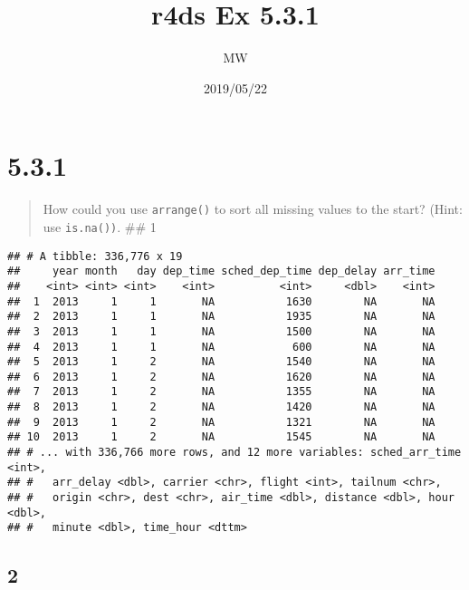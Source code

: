 \documentclass[]{article}
\title{r4ds Ex 5.3.1}
\author{MW}
\date{2019/05/22}
\newenvironment{Shaded}{\begin{snugshade}}{\end{snugshade}}
\newcommand{\KeywordTok}[1]{\textcolor[rgb]{0.13,0.29,0.53}{\textbf{#1}}}
\newcommand{\NormalTok}[1]{#1}
\newcommand{\OperatorTok}[1]{\textcolor[rgb]{0.81,0.36,0.00}{\textbf{#1}}}
\newcommand{\StringTok}[1]{\textcolor[rgb]{0.31,0.60,0.02}{#1}}
\begin{document}
\maketitle

\hypertarget{section}{%
\section{5.3.1}\label{section}}

\begin{quote}
How could you use \texttt{arrange()} to sort all missing values to the
start? (Hint: use \texttt{is.na())}. \#\# 1
\end{quote}

\begin{Shaded}
\end{Shaded}

\begin{verbatim}
## # A tibble: 336,776 x 19
##     year month   day dep_time sched_dep_time dep_delay arr_time
##    <int> <int> <int>    <int>          <int>     <dbl>    <int>
##  1  2013     1     1       NA           1630        NA       NA
##  2  2013     1     1       NA           1935        NA       NA
##  3  2013     1     1       NA           1500        NA       NA
##  4  2013     1     1       NA            600        NA       NA
##  5  2013     1     2       NA           1540        NA       NA
##  6  2013     1     2       NA           1620        NA       NA
##  7  2013     1     2       NA           1355        NA       NA
##  8  2013     1     2       NA           1420        NA       NA
##  9  2013     1     2       NA           1321        NA       NA
## 10  2013     1     2       NA           1545        NA       NA
## # ... with 336,766 more rows, and 12 more variables: sched_arr_time <int>,
## #   arr_delay <dbl>, carrier <chr>, flight <int>, tailnum <chr>,
## #   origin <chr>, dest <chr>, air_time <dbl>, distance <dbl>, hour <dbl>,
## #   minute <dbl>, time_hour <dttm>
\end{verbatim}

\hypertarget{section-1}{%
\subsection{2}\label{section-1}}
\end{document}
